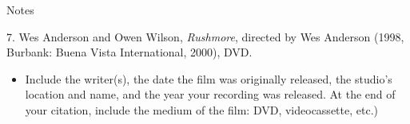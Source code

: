 \begin{center}{Notes}\end{center} 

\begin{singlespace}
\noindent\hspace{1.2cm}7. Wes Anderson and
Owen Wilson, \emph{Rushmore}, directed by Wes Anderson (1998, Burbank: Buena
Vista International, 2000), DVD.
\end{singlespace}

\begin{itemize}\item Include the writer(s), the date the film was originally
released, the studio's location and name, and the year your recording was
released. At the end of your citation, include the medium of the film: DVD,
videocassette, etc.)\end{itemize}


